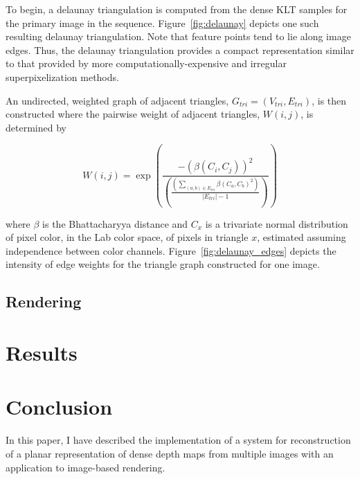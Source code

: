 \documentclass[conference]{acmsiggraph}
\begin{document}
To begin, a delaunay triangulation is computed from the dense KLT samples
for the primary image in the sequence.
Figure~\ref{fig:delaunay} depicts one such resulting delaunay triangulation.
Note that feature points tend to lie along image edges.  Thus, the
delaunay triangulation provides a compact representation similar
to that provided by more computationally-expensive and irregular
superpixelization methods.

An undirected, weighted graph of adjacent triangles,
$G_{tri} = (V_{tri}, E_{tri})$, is then constructed
where the pairwise weight of adjacent triangles, $W(i, j)$, is determined by

\begin{equation}
    W(i, j) = \exp \left(
        \dfrac{-(\beta(C_i, C_j))^2}
        {
            \left(
                \frac{
                    (\sum_{(a, b) \in E_{tri}} \beta(C_a, C_b)^2)
                }
                {
                    |E_{tri}| - 1
                }
            \right)
        }
    \right)
\end{equation}

where $\beta$ is the Bhattacharyya distance \cite{bhattacharyya1946measure}
and $C_x$ is a trivariate normal distribution of pixel color, in the Lab color
space, of pixels in triangle $x$, estimated assuming independence between color
channels. Figure~\ref{fig:delaunay_edges} depicts the intensity of edge weights
for the triangle graph constructed for one image.  



\subsection{Rendering}


\section{Results}




\section{Conclusion}

In this paper, I have described the implementation of a system for
reconstruction of a planar representation of dense depth maps from multiple images
with an application to image-based rendering.





\end{document}
